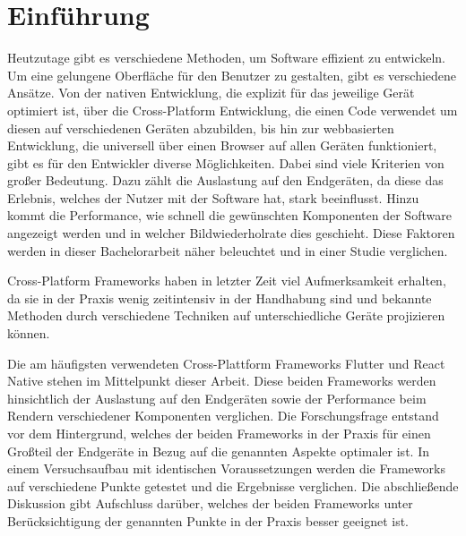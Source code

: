 \section{Einführung}
Heutzutage gibt es verschiedene Methoden, um Software effizient zu entwickeln. Um eine gelungene Oberfläche für den Benutzer zu gestalten, gibt es verschiedene Ansätze. Von der nativen Entwicklung, die explizit für das jeweilige Gerät optimiert ist, über die Cross-Platform Entwicklung, die einen Code verwendet um diesen auf verschiedenen Geräten abzubilden, bis hin zur webbasierten Entwicklung, die universell über einen Browser auf allen Geräten funktioniert, gibt es für den Entwickler diverse Möglichkeiten. Dabei sind viele Kriterien von großer Bedeutung. Dazu zählt die Auslastung auf den Endgeräten, da diese das Erlebnis, welches der Nutzer mit der Software hat, stark beeinflusst. Hinzu kommt die Performance, wie schnell die gewünschten Komponenten der Software angezeigt werden und in welcher Bildwiederholrate dies geschieht. Diese Faktoren werden in dieser Bachelorarbeit näher beleuchtet und in einer Studie verglichen.

Cross-Platform Frameworks haben in letzter Zeit viel Aufmerksamkeit erhalten, da sie in der Praxis wenig zeitintensiv in der Handhabung sind und bekannte Methoden durch verschiedene Techniken auf unterschiedliche Geräte projizieren können.

Die am häufigsten verwendeten Cross-Plattform Frameworks Flutter und React Native stehen im Mittelpunkt dieser Arbeit. Diese beiden Frameworks werden hinsichtlich der Auslastung auf den Endgeräten sowie der Performance beim Rendern verschiedener Komponenten verglichen. Die Forschungsfrage entstand vor dem Hintergrund, welches der beiden Frameworks in der Praxis für einen Großteil der Endgeräte in Bezug auf die genannten Aspekte optimaler ist. In einem Versuchsaufbau mit identischen Voraussetzungen werden die Frameworks auf verschiedene Punkte getestet und die Ergebnisse verglichen. Die abschließende Diskussion gibt Aufschluss darüber, welches der beiden Frameworks unter Berücksichtigung der genannten Punkte in der Praxis besser geeignet ist.